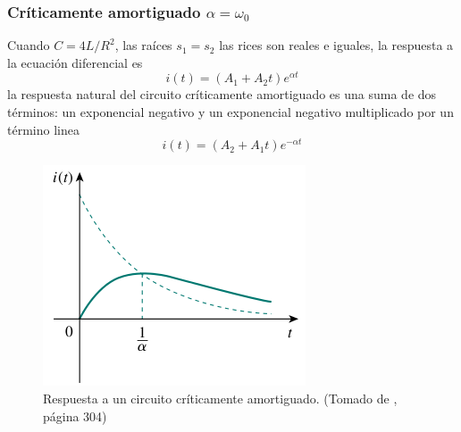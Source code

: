 \documentclass[twocolumn]{IEEEtran}
\begin{document}
\subsubsection*{Críticamente amortiguado $\alpha = \omega _0$}
\noindent
Cuando $C = 4L/{R^2}$, las raíces $s_1=s_2$ las rices son reales e iguales, la respuesta a la ecuación diferencial es
\begin{equation}
 i(t) = ({A_1} + {A_2}t){e ^{\alpha t}}
\end{equation}
\noindent
la respuesta natural del circuito críticamente amortiguado es una suma de dos términos: un exponencial negativo y un exponencial negativo multiplicado por un término linea
\begin{equation}
 i(t) = ({A_2} + {A_1}t){e ^{-\alpha t}}
\end{equation}
\begin{figure}[H]
	\centering
		\includegraphics[scale=0.5]{amor.png}
	\caption{Respuesta a un circuito críticamente amortiguado. (Tomado de \cite{sadiku}, página 304)}
	\label{amortiguado}
\end{figure}
\end{document}
